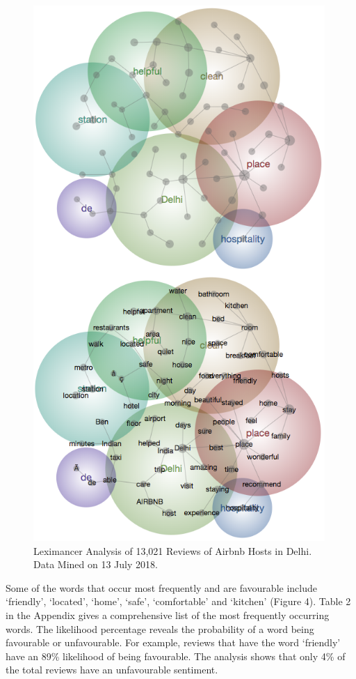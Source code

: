 \documentclass[a4paper, 12pt, twoside]{article}
\begin{document}
\begin{figure}[h!]
\centering
\includegraphics[height=8in]{figure6.png} 
\captionsetup{justification=centering}\caption{Leximancer Analysis of 13,021 Reviews of Airbnb Hosts in Delhi. Data Mined on 13 July 2018.}
\end{figure}

Some of the words that occur most frequently and are favourable include ‘friendly’, ‘located’, ‘home’, ‘safe’, ‘comfortable’ and ‘kitchen’ (Figure 4). Table 2 in the Appendix gives a comprehensive list of the most frequently occurring words. The likelihood percentage reveals the probability of a word being favourable or unfavourable. For example, reviews that have the word ‘friendly’ have an 89\% likelihood of being favourable. The analysis shows that only 4\% of the total reviews have an unfavourable sentiment.\\
\end{document}
